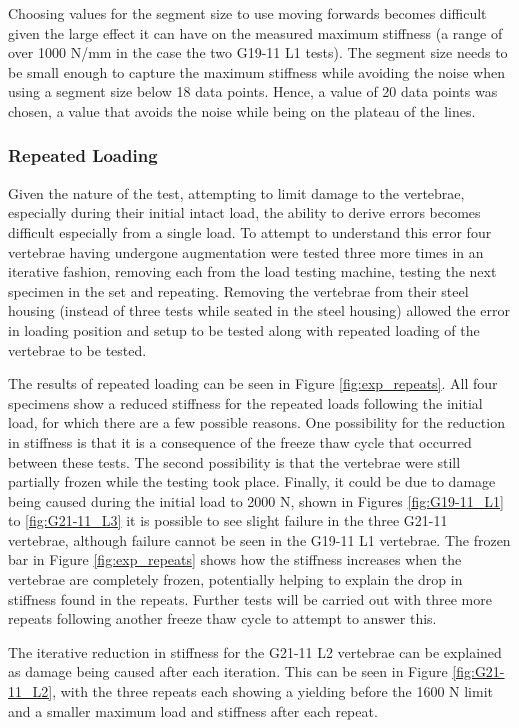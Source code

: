 Choosing values for the segment size to use moving forwards becomes difficult given the large effect it can have on the measured maximum stiffness (a range of over 1000 N/mm in the case the two G19-11 L1 tests).
The segment size needs to be small enough to capture the maximum stiffness while avoiding the noise when using a segment size below 18 data points.
Hence, a value of 20 data points was chosen, a value that avoids the noise while being on the plateau of the lines.


\subsubsection{Repeated Loading}

Given the nature of the test, attempting to limit damage to the vertebrae, especially during their initial intact load, the ability to derive errors becomes difficult especially from a single load.
To attempt to understand this error four vertebrae having undergone augmentation were tested three more times in an iterative fashion, removing each from the load testing machine, testing the next specimen in the set and repeating.
Removing the vertebrae from their steel housing (instead of three tests while seated in the steel housing) allowed the error in loading position and setup to be tested along with repeated loading of the vertebrae to be tested.

The results of repeated loading can be seen in Figure \ref{fig:exp_repeats}.
All four specimens show a reduced stiffness for the repeated loads following the initial load, for which there are a few possible reasons.
One possibility for the reduction in stiffness is that it is a consequence of the freeze thaw cycle that occurred between these tests.
The second possibility is that the vertebrae were still partially frozen while the testing took place.
Finally, it could be due to damage being caused during the initial load to 2000 N, shown in Figures \ref{fig:G19-11_L1} to \ref{fig:G21-11_L3} it is possible to see slight failure in the three G21-11 vertebrae, although failure cannot be seen in the G19-11 L1 vertebrae.
The frozen bar in Figure \ref{fig:exp_repeats} shows how the stiffness increases when the vertebrae are completely frozen, potentially helping to explain the drop in stiffness found in the repeats.
Further tests will be carried out with three more repeats following another freeze thaw cycle to attempt to answer this.

The iterative reduction in stiffness for the G21-11 L2 vertebrae can be explained as damage being caused after each iteration.
This can be seen in Figure \ref{fig:G21-11_L2}, with the three repeats each showing a yielding before the 1600 N limit and a smaller maximum load and stiffness after each repeat.

